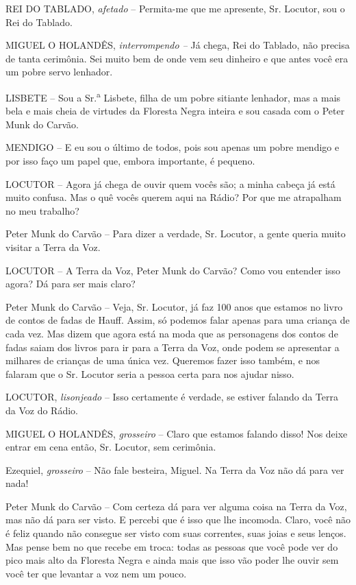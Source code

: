 REI DO TABLADO, \emph{afetado} -- Permita-me que me apresente, Sr.
Locutor, sou o Rei do Tablado.

MIGUEL O HOLANDÊS, \emph{interrompendo --} Já chega, Rei do Tablado, não
precisa de tanta cerimônia. Sei muito bem de onde vem seu dinheiro e que
antes você era um pobre servo lenhador.

LISBETE -- Sou a Sr.\textsuperscript{a} Lisbete, filha de um pobre
sitiante lenhador, mas a mais bela e mais cheia de virtudes da Floresta
Negra inteira e sou casada com o Peter Munk do Carvão.

MENDIGO -- E eu sou o último de todos, pois sou apenas um pobre mendigo
e por isso faço um papel que, embora importante, é pequeno.

LOCUTOR -- Agora já chega de ouvir quem vocês são; a minha cabeça já
está muito confusa. Mas o quê vocês querem aqui na Rádio? Por que me
atrapalham no meu trabalho?

Peter Munk do Carvão -- Para dizer a verdade, Sr. Locutor, a gente
queria muito visitar a Terra da Voz.

LOCUTOR -- A Terra da Voz, Peter Munk do Carvão? Como vou entender isso
agora? Dá para ser mais claro?

Peter Munk do Carvão -- Veja, Sr. Locutor, já faz 100 anos que estamos
no livro de contos de fadas de Hauff. Assim, só podemos falar apenas
para uma criança de cada vez. Mas dizem que agora está na moda que as
personagens dos contos de fadas saiam dos livros para ir para a Terra da
Voz, onde podem se apresentar a milhares de crianças de uma única vez.
Queremos fazer isso também, e nos falaram que o Sr. Locutor seria a
pessoa certa para nos ajudar nisso.

LOCUTOR, \emph{lisonjeado} -- Isso certamente é verdade, se estiver
falando da Terra da Voz do Rádio.

MIGUEL O HOLANDÊS, \emph{grosseiro} -- Claro que estamos falando disso!
Nos deixe entrar em cena então, Sr. Locutor, sem cerimônia.

Ezequiel, \emph{grosseiro} -- Não fale besteira, Miguel. Na Terra da Voz
não dá para ver nada!

Peter Munk do Carvão -- Com certeza dá para ver alguma coisa na Terra da
Voz, mas não dá para ser visto. E percebi que é isso que lhe incomoda.
Claro, você não é feliz quando não consegue ser visto com suas
correntes, suas joias e seus lenços. Mas pense bem no que recebe em
troca: todas as pessoas que você pode ver do pico mais alto da Floresta
Negra e ainda mais que isso vão poder lhe ouvir sem você ter que
levantar a voz nem um pouco.

